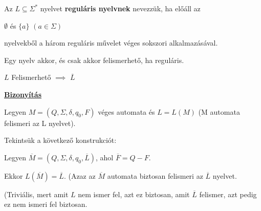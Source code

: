 \documentclass[10pt]{article}
\renewcommand{\\}{\par\noindent}
\begin{document}
\begin{frame}

\begin{tcolorbox}[title={Def.: Reguláris nyelv}]
Az $L \subseteq {\Sigma}^*$ nyelvet \textbf{reguláris nyelvnek} nevezzük, ha előáll az\\
$\emptyset$ és $\{a\}$ $(a \in {\Sigma})$\\
nyelvekből a három reguláris művelet véges sokszori alkalmazásával.
\end{tcolorbox}

\begin{tcolorbox}[title={Tétel: Kleene tétel}]
Egy nyelv akkor, és csak akkor felismerhető, ha reguláris.
\end{tcolorbox}

\end{frame}

\begin{frame}
\begin{tcolorbox}[title={Tétel: Felismerhető nyelvek komplementere}]
$L$ Felismerhető $\implies$ $\overline{L}$\\
\tcblower
\smallskip
\underline{\textbf{Bizonyítás}}\\
\medskip
\\
Legyen $M = (Q, \Sigma , \delta , q_0, F)$ véges automata és $L = L(M)$ (M automata felismeri az L nyelvet).\\
Tekintsük a következő konstrukciót:\\
Legyen $\overline{M} = (Q, \Sigma , \delta, q_0, \overline{L})$, ahol $\overline{F} = Q - F$.\\
Ekkor  $L(\overline{M}) = \overline{L}$. (Azaz az $\overline{M}$ automata biztosan felismeri az $\overline{L}$ nyelvet.\\ 
(Triviális, mert amit $L$ nem ismer fel, azt ez biztosan, amit $\overline{L}$ felismer, azt pedig ez nem ismeri fel biztosan.

\end{tcolorbox}

\end{frame}
\end{document}
